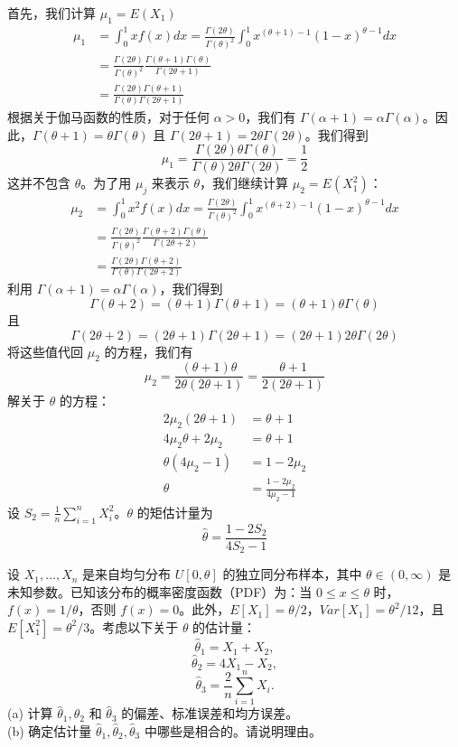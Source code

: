 \begin{questions}
\begin{solution}
首先，我们计算 $\mu_1 = E(X_1)$
\begin{align*}
\mu_1 &= \int_0^1 x f(x) dx = \frac{\Gamma(2\theta)}{\Gamma(\theta)^2} \int_0^1 x^{(\theta+1)-1} (1 - x)^{\theta-1} dx \\
&= \frac{\Gamma(2\theta)}{\Gamma(\theta)^2} \frac{\Gamma(\theta + 1)\Gamma(\theta)}{\Gamma(2\theta + 1)} \\
&= \frac{\Gamma(2\theta)\Gamma(\theta + 1)}{\Gamma(\theta)\Gamma(2\theta + 1)}
\end{align*}
根据关于伽马函数的性质，对于任何 $\alpha > 0$，我们有 $\Gamma(\alpha + 1) = \alpha\Gamma(\alpha)$。因此，$\Gamma(\theta + 1) = \theta\Gamma(\theta)$ 且 $\Gamma(2\theta + 1) = 2\theta\Gamma(2\theta)$。我们得到
\[
\mu_1 = \frac{\Gamma(2\theta) \theta \Gamma(\theta)}{\Gamma(\theta) 2\theta \Gamma(2\theta)} = \frac{1}{2}
\]
这并不包含 $\theta$。为了用 $\mu_j$ 来表示 $\theta$，我们继续计算 $\mu_2 = E(X_1^2)$：
\begin{align*}
\mu_2 &= \int_0^1 x^2 f(x) dx = \frac{\Gamma(2\theta)}{\Gamma(\theta)^2} \int_0^1 x^{(\theta+2)-1} (1 - x)^{\theta-1} dx \\
&= \frac{\Gamma(2\theta)}{\Gamma(\theta)^2} \frac{\Gamma(\theta + 2)\Gamma(\theta)}{\Gamma(2\theta + 2)} \\
&= \frac{\Gamma(2\theta)\Gamma(\theta + 2)}{\Gamma(\theta)\Gamma(2\theta + 2)}
\end{align*}
利用 $\Gamma(\alpha + 1) = \alpha\Gamma(\alpha)$，我们得到
\[
\Gamma(\theta + 2) = (\theta + 1)\Gamma(\theta + 1) = (\theta + 1)\theta\Gamma(\theta)
\]
且
\[
\Gamma(2\theta + 2) = (2\theta + 1)\Gamma(2\theta + 1) = (2\theta + 1)2\theta\Gamma(2\theta)
\]
将这些值代回 $\mu_2$ 的方程，我们有
\[
\mu_2 = \frac{(\theta + 1)\theta}{2\theta(2\theta + 1)} = \frac{\theta + 1}{2(2\theta + 1)}
\]
解关于 $\theta$ 的方程：
\begin{align*}
2\mu_2(2\theta + 1) &= \theta + 1 \\
4\mu_2 \theta + 2\mu_2 &= \theta + 1 \\
\theta(4\mu_2 - 1) &= 1 - 2\mu_2 \\
\theta &= \frac{1 - 2\mu_2}{4\mu_2 - 1}
\end{align*}
设 $S_2 = \frac{1}{n} \sum_{i=1}^n X_i^2$。$\theta$ 的矩估计量为
\[
\hat{\theta} = \frac{1 - 2S_2}{4S_2 - 1}
\]
\end{solution}

    \question
设 $X_1, \dots, X_n$ 是来自均匀分布 $U[0, \theta]$ 的独立同分布样本，其中 $\theta \in (0, \infty)$ 是未知参数。已知该分布的概率密度函数（PDF）为：当 $0 \le x \le \theta$ 时，$f(x) = 1/\theta$，否则 $f(x) = 0$。此外，$E[X_1] = \theta/2$，$Var[X_1] = \theta^2/12$，且 $E[X_1^2] = \theta^2/3$。考虑以下关于 $\theta$ 的估计量：
\[
\hat{\theta}_1 = X_1 + X_2,
\]
\[
\hat{\theta}_2 = 4X_1 - X_2,
\]
\[
\hat{\theta}_3 = \frac{2}{n} \sum_{i=1}^{n} X_i.
\]
(a) 计算 $\hat{\theta}_1, \hat{\theta}_2$ 和 $\hat{\theta}_3$ 的偏差、标准误差和均方误差。\\
(b) 确定估计量 $\hat{\theta}_1, \hat{\theta}_2, \hat{\theta}_3$ 中哪些是相合的。请说明理由。


\end{questions}
